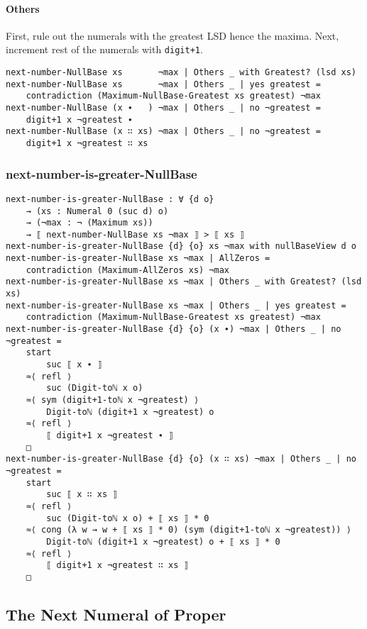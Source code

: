 \documentclass[\main/thesis.tex]{subfiles}
\begin{document}
\paragraph{Others}

First, rule out the numerals with the greatest LSD hence the maxima.
Next, increment rest of the numerals with {\lstinline|digit+1|}.

\begin{lstlisting}[basicstyle=\ttfamily\scriptsize]
next-number-NullBase xs       ¬max | Others _ with Greatest? (lsd xs)
next-number-NullBase xs       ¬max | Others _ | yes greatest =
    contradiction (Maximum-NullBase-Greatest xs greatest) ¬max
next-number-NullBase (x ∙   ) ¬max | Others _ | no ¬greatest =
    digit+1 x ¬greatest ∙
next-number-NullBase (x ∷ xs) ¬max | Others _ | no ¬greatest =
    digit+1 x ¬greatest ∷ xs
\end{lstlisting}

\subsubsection{next-number-is-greater-NullBase}

\begin{lstlisting}[basicstyle=\ttfamily\scriptsize]
next-number-is-greater-NullBase : ∀ {d o}
    → (xs : Numeral 0 (suc d) o)
    → (¬max : ¬ (Maximum xs))
    → ⟦ next-number-NullBase xs ¬max ⟧ > ⟦ xs ⟧
next-number-is-greater-NullBase {d} {o} xs ¬max with nullBaseView d o
next-number-is-greater-NullBase xs ¬max | AllZeros =
    contradiction (Maximum-AllZeros xs) ¬max
next-number-is-greater-NullBase xs ¬max | Others _ with Greatest? (lsd xs)
next-number-is-greater-NullBase xs ¬max | Others _ | yes greatest =
    contradiction (Maximum-NullBase-Greatest xs greatest) ¬max
next-number-is-greater-NullBase {d} {o} (x ∙) ¬max | Others _ | no ¬greatest =
    start
        suc ⟦ x ∙ ⟧
    ≈⟨ refl ⟩
        suc (Digit-toℕ x o)
    ≈⟨ sym (digit+1-toℕ x ¬greatest) ⟩
        Digit-toℕ (digit+1 x ¬greatest) o
    ≈⟨ refl ⟩
        ⟦ digit+1 x ¬greatest ∙ ⟧
    □
next-number-is-greater-NullBase {d} {o} (x ∷ xs) ¬max | Others _ | no ¬greatest =
    start
        suc ⟦ x ∷ xs ⟧
    ≈⟨ refl ⟩
        suc (Digit-toℕ x o) + ⟦ xs ⟧ * 0
    ≈⟨ cong (λ w → w + ⟦ xs ⟧ * 0) (sym (digit+1-toℕ x ¬greatest)) ⟩
        Digit-toℕ (digit+1 x ¬greatest) o + ⟦ xs ⟧ * 0
    ≈⟨ refl ⟩
        ⟦ digit+1 x ¬greatest ∷ xs ⟧
    □
\end{lstlisting}

\subsection{The Next Numeral of Proper}

%
\end{document}
